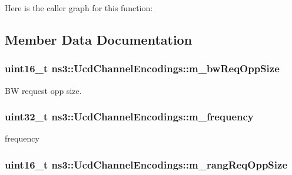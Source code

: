 Here is the caller graph for this function\+:




\subsection{Member Data Documentation}
\subsubsection[{\texorpdfstring{m\+\_\+bw\+Req\+Opp\+Size}{m_bwReqOppSize}}]{\setlength{\rightskip}{0pt plus 5cm}uint16\+\_\+t ns3\+::\+Ucd\+Channel\+Encodings\+::m\+\_\+bw\+Req\+Opp\+Size\hspace{0.3cm}{\ttfamily [private]}}\hypertarget{classns3_1_1UcdChannelEncodings_a26a48aaaf57003262302adbfce6d5f0c}{}\label{classns3_1_1UcdChannelEncodings_a26a48aaaf57003262302adbfce6d5f0c}


BW request opp size. 

\subsubsection[{\texorpdfstring{m\+\_\+frequency}{m_frequency}}]{\setlength{\rightskip}{0pt plus 5cm}uint32\+\_\+t ns3\+::\+Ucd\+Channel\+Encodings\+::m\+\_\+frequency\hspace{0.3cm}{\ttfamily [private]}}\hypertarget{classns3_1_1UcdChannelEncodings_a72ba94cddb5f801b46519154b8b869bd}{}\label{classns3_1_1UcdChannelEncodings_a72ba94cddb5f801b46519154b8b869bd}


frequency 

\subsubsection[{\texorpdfstring{m\+\_\+rang\+Req\+Opp\+Size}{m_rangReqOppSize}}]{\setlength{\rightskip}{0pt plus 5cm}uint16\+\_\+t ns3\+::\+Ucd\+Channel\+Encodings\+::m\+\_\+rang\+Req\+Opp\+Size\hspace{0.3cm}{\ttfamily [private]}}\hypertarget{classns3_1_1UcdChannelEncodings_a91a0d665b88ad3d3b73118d4a632c0e6}{}\label{classns3_1_1UcdChannelEncodings_a91a0d665b88ad3d3b73118d4a632c0e6}


